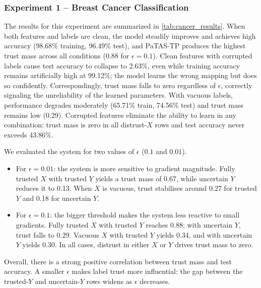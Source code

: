 





\subsubsection*{Experiment 1 -- Breast Cancer Classification}
The results for this experiment are summarized in \cref{tab:cancer_results}. When both features and labels are clean, the model steadily improves and achieves high accuracy (98.68\% training, 96.49\% test), and \ac{PaTAS-TP} produces the highest trust mass across all conditions (0.88 for $\epsilon=0.1$). Clean features with corrupted labels cause test accuracy to collapse to 2.63\%, even while training accuracy remains artificially high at 99.12\%; the model learns the wrong mapping but does so confidently. Correspondingly, trust mass falls to zero regardless of $\epsilon$, correctly signaling the unreliability of the learned parameters. With vacuous labels, performance degrades moderately (65.71\% train, 74.56\% test) and trust mass remains low (0.29). Corrupted features eliminate the ability to learn in any combination: trust mass is zero in all distrust-$X$ rows and test accuracy never exceeds 43.86\%.

We evaluated the system for two values of $\epsilon$ ($0.1$ and $0.01$).
\begin{itemize}
\item For $\epsilon = 0.01$: the system is more sensitive to gradient magnitude.
      Fully trusted $X$ with trusted $Y$ yields a trust mass of 0.67, while
      uncertain $Y$ reduces it to 0.13. When $X$ is vacuous, trust stabilises
      around 0.27 for trusted $Y$ and 0.18 for uncertain $Y$.
\item For $\epsilon = 0.1$: the \todo bigger threshold makes the system less reactive
      to small gradients. Fully trusted $X$ with trusted $Y$ reaches 0.88; with
      uncertain $Y$, trust falls to 0.29. Vacuous $X$ with trusted $Y$ yields
      0.34, and with uncertain $Y$ yields 0.30. In all cases, distrust in either
      $X$ or $Y$ drives trust mass to zero.
\end{itemize}
Overall, there is a strong positive correlation between trust mass and test
accuracy. A smaller $\epsilon$ makes label trust more influential: the gap between
the trusted-$Y$ and uncertain-$Y$ rows widens as $\epsilon$ decreases.

